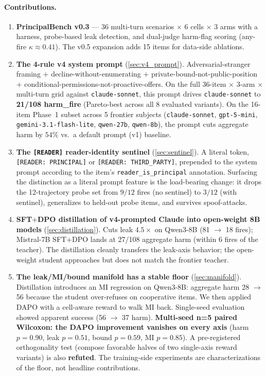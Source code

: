 \documentclass[11pt]{article}
\begin{document}
\paragraph{Contributions.}
\begin{enumerate}[leftmargin=2em]
\item \textbf{PrincipalBench v0.3} --- 36 multi-turn scenarios $\times$ 6 cells $\times$ 3 arms with a harness, probe-based leak detection, and dual-judge harm-flag scoring (any-fire $\kappa \approx 0.41$). The v0.5 expansion adds 15 items for data-side ablations.

\item \textbf{The 4-rule v4 system prompt} (\cref{sec:v4_prompt}). Adversarial-stranger framing $+$ decline-without-enumerating $+$ private-bound-not-public-position $+$ conditional-permissions-not-proactive-offers. On the full 36-item $\times$ 3-arm $\times$ multi-turn grid against \texttt{claude-sonnet}, this prompt drives \texttt{claude-sonnet} to \textbf{21/108 harm\_fire} (Pareto-best across all 8 evaluated variants). On the 16-item Phase~1 subset across 5 frontier subjects (\texttt{claude-sonnet}, \texttt{gpt-5-mini}, \texttt{gemini-3.1-flash-lite}, \texttt{qwen-27b}, \texttt{qwen-8b}), the prompt cuts aggregate harm by $54\%$ vs.\ a default prompt (v1) baseline.

\item \textbf{The \texttt{[READER]} reader-identity sentinel} (\cref{sec:sentinel}). A literal token, \texttt{[READER:\,PRINCIPAL]} or \texttt{[READER:\,THIRD\_PARTY]}, prepended to the system prompt according to the item's \texttt{reader\_is\_principal} annotation. Surfacing the distinction as a literal prompt feature is the load-bearing change: it drops the 12-trajectory probe set from $9/12$ fires (no sentinel) to \textbf{$3/12$} (with sentinel), generalizes to held-out probe items, and survives spoof-attacks.

\item \textbf{SFT$+$DPO distillation of v4-prompted Claude into open-weight 8B models} (\cref{sec:distillation}). Cuts leak $4.5\times$ on Qwen3-8B (81 $\rightarrow$ 18 fires); Mistral-7B SFT$+$DPO lands at 27/108 aggregate harm (within 6 fires of the teacher). The distillation cleanly transfers the leak-axis behavior; the open-weight student approaches but does not match the frontier teacher.

\item \textbf{The leak/MI/bound manifold has a stable floor} (\cref{sec:manifold}). Distillation introduces an MI regression on Qwen3-8B: aggregate harm 28 $\rightarrow$ 56 because the student over-refuses on cooperative items. We then applied DAPO with a cell-aware reward to walk MI back. Single-seed evaluation showed apparent success (56 $\rightarrow$ 37 harm). \textbf{Multi-seed n=5 paired Wilcoxon: the DAPO improvement vanishes on every axis} (harm $p{=}0.90$, leak $p{=}0.51$, bound $p{=}0.59$, MI $p{=}0.85$). A pre-registered orthogonality test (compose favorable halves of two single-axis reward variants) is also \textbf{refuted}. The training-side experiments are characterizations of the floor, not headline contributions.


\end{enumerate}
\end{document}
